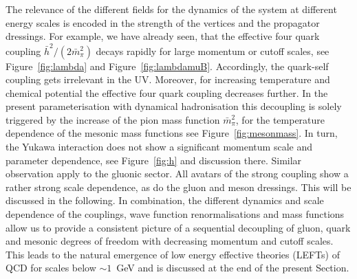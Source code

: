 \documentclass[%
reprint,
superscriptaddress,
showpacs,preprintnumbers,
 amsmath,amssymb,
 aps,
prd,
]{revtex4-1}
\def\fig#1{Figure~\ref{#1}}
\begin{document}
The relevance of the different fields for the dynamics of the system
at different energy scales is encoded in the strength of the vertices
and the propagator dressings. For example, we have already seen, that
the effective four quark coupling $\bar h^2/(2 \bar m^2_\pi)$ decays
rapidly for large momentum or cutoff scales, see \fig{fig:lambda} and
\fig{fig:lambdamuB}. Accordingly, the quark-self coupling gets
irrelevant in the UV. Moreover, for increasing temperature and
chemical potential the effective four quark coupling decreases
further. In the present parameterisation with dynamical hadronisation
this decoupling is solely triggered by the increase of the pion mass
function $\bar m^2_\pi$, for the temperature dependence of the mesonic
mass functions see \fig{fig:mesonmass}. In turn, the Yukawa
interaction does not show a significant momentum scale and parameter
dependence, see \fig{fig:h} and discussion there. Similar observation
apply to the gluonic sector. All avatars of the strong coupling show a
rather strong scale dependence, as do the gluon and meson
dressings. This will be discussed in the following. In combination,
the different dynamics and scale dependence of the couplings, wave
function renormalisations and mass functions allow us to provide a
consistent picture of a sequential decoupling of gluon, quark and
mesonic degrees of freedom with decreasing momentum and cutoff
scales. This leads to the natural emergence of low energy effective
theories (LEFTs) of QCD for scales below $\sim 1$\, GeV and is
discussed at the end of the present Section.
\end{document}
